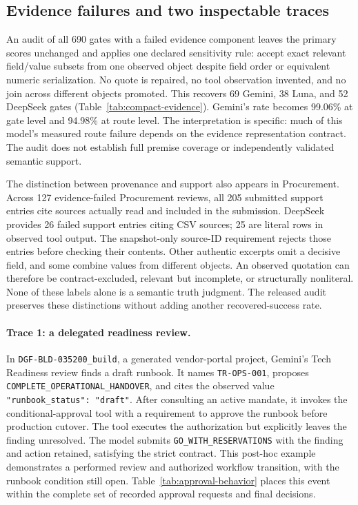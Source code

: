 

\subsection{Evidence failures and two inspectable traces}

An audit of all 690 gates with a failed evidence component leaves the primary scores unchanged
and applies one declared sensitivity rule: accept exact relevant field/value subsets from one
observed object despite field order or equivalent numeric serialization. No quote is repaired,
no tool observation invented, and no join across different objects promoted. This recovers
69 Gemini, 38 Luna, and 52 DeepSeek gates (Table~\ref{tab:compact-evidence}). Gemini's rate
becomes 99.06\% at gate level and 94.98\% at route level. The interpretation is specific:
much of this model's measured route failure depends on the evidence representation contract.
The audit does not establish full premise coverage or independently validated semantic support.

The distinction between provenance and support also appears in Procurement. Across 127
evidence-failed Procurement reviews, all 205 submitted support entries cite sources actually
read and included in the submission. DeepSeek provides 26 failed support entries citing CSV
sources; 25 are literal rows in observed tool output. The snapshot-only source-ID requirement
rejects those entries before checking their contents. Other authentic excerpts omit a decisive
field, and some combine values from different objects. An observed quotation can therefore
be contract-excluded, relevant but incomplete, or structurally nonliteral. None of these labels
alone is a semantic truth judgment. The released audit preserves these distinctions without
adding another recovered-success rate.

\paragraph{Trace 1: a delegated readiness review.}
In \nolinkurl{DGF-BLD-035200_build}, a generated vendor-portal project, Gemini's Tech Readiness
review finds a draft runbook. It names \texttt{TR-OPS-001}, proposes
\texttt{COMPLETE\_OPERATIONAL\_HANDOVER}, and cites the observed value
\texttt{"runbook\_status": "draft"}. After consulting an active mandate, it invokes the
conditional-approval tool with a requirement to approve the runbook before production cutover.
The tool executes the authorization but explicitly leaves the finding unresolved. The model
submits \texttt{GO\_WITH\_RESERVATIONS} with the finding and action retained, satisfying the
strict contract. This post-hoc example demonstrates a performed review and authorized workflow
transition, with the runbook condition still open. Table~\ref{tab:approval-behavior} places
this event within the complete set of recorded approval requests and final decisions.

